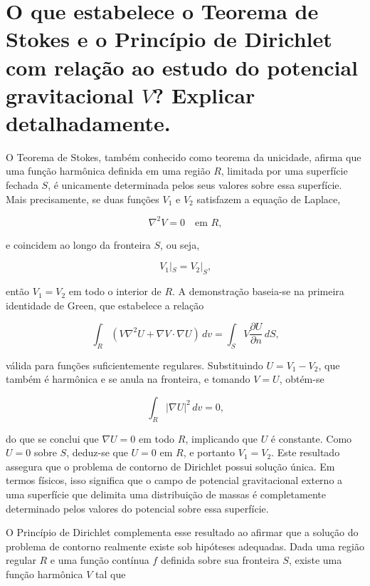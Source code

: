 
\section{O que estabelece o Teorema de Stokes e o Princípio de Dirichlet com relação ao estudo do potencial gravitacional $V$? Explicar detalhadamente.}


O Teorema de Stokes, também conhecido como teorema da unicidade, afirma que uma função harmônica definida em uma região \( R \), limitada por uma superfície fechada \( S \), é unicamente determinada pelos seus valores sobre essa superfície. Mais precisamente, se duas funções \( V_1 \) e \( V_2 \) satisfazem a equação de Laplace,

\[
\nabla^2 V = 0 \quad \text{em } R \text{,}
\]

\noindent
e coincidem ao longo da fronteira \( S \), ou seja,

\[
V_1|_S = V_2|_S \text{,}
\]

\noindent
então \( V_1 = V_2 \) em todo o interior de \( R \). A demonstração baseia-se na primeira identidade de Green, que estabelece a relação

\[
\int_R (V \nabla^2 U + \nabla V \cdot \nabla U) \, dv = \int_S V \frac{\partial U}{\partial n} \, dS \text{,}
\]

\noindent
válida para funções suficientemente regulares. Substituindo \( U = V_1 - V_2 \), que também é harmônica e se anula na fronteira, e tomando \( V = U \), obtém-se

\[
\int_R |\nabla U|^2 \, dv = 0 \text{,}
\]

\noindent
do que se conclui que \( \nabla U = 0 \) em todo \( R \), implicando que \( U \) é constante. Como \( U = 0 \) sobre \( S \), deduz-se que \( U = 0 \) em \( R \), e portanto \( V_1 = V_2 \). Este resultado assegura que o problema de contorno de Dirichlet possui solução única. Em termos físicos, isso significa que o campo de potencial gravitacional externo a uma superfície que delimita uma distribuição de massas é completamente determinado pelos valores do potencial sobre essa superfície.

O Princípio de Dirichlet complementa esse resultado ao afirmar que a solução do problema de contorno realmente existe sob hipóteses adequadas. Dada uma região regular \( R \) e uma função contínua \( f \) definida sobre sua fronteira \( S \), existe uma função harmônica \( V \) tal que

